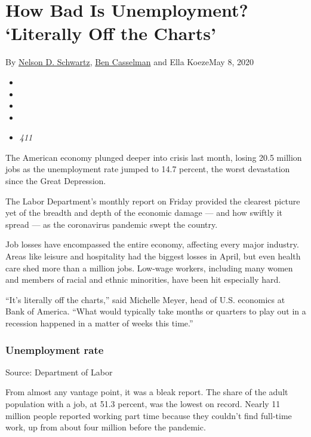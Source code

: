 \hypertarget{how-bad-is-unemployment-literally-off-the-charts}{%
\section{How Bad Is Unemployment? `Literally Off the
Charts'}\label{how-bad-is-unemployment-literally-off-the-charts}}

By \href{https://www.nytimes3xbfgragh.onion/by/nelson-d-schwartz}{Nelson
D. Schwartz},
\href{https://www.nytimes3xbfgragh.onion/by/ben-casselman}{Ben
Casselman} and Ella KoezeMay 8, 2020

\begin{itemize}
\item
\item
\item
\item
\item
  \emph{411}
\end{itemize}

The American economy plunged deeper into crisis last month, losing 20.5
million jobs as the unemployment rate jumped to 14.7 percent, the worst
devastation since the Great Depression.

The Labor Department's monthly report on Friday provided the clearest
picture yet of the breadth and depth of the economic damage --- and how
swiftly it spread --- as the coronavirus pandemic swept the country.

Job losses have encompassed the entire economy, affecting every major
industry. Areas like leisure and hospitality had the biggest losses in
April, but even health care shed more than a million jobs. Low-wage
workers, including many women and members of racial and ethnic
minorities, have been hit especially hard.

``It's literally off the charts,'' said Michelle Meyer, head of U.S.
economics at Bank of America. ``What would typically take months or
quarters to play out in a recession happened in a matter of weeks this
time.''

\hypertarget{unemployment-rate}{%
\subsubsection{Unemployment rate}\label{unemployment-rate}}

Source: Department of Labor

From almost any vantage point, it was a bleak report. The share of the
adult population with a job, at 51.3 percent, was the lowest on record.
Nearly 11 million people reported working part time because they
couldn't find full-time work, up from about four million before the
pandemic.

